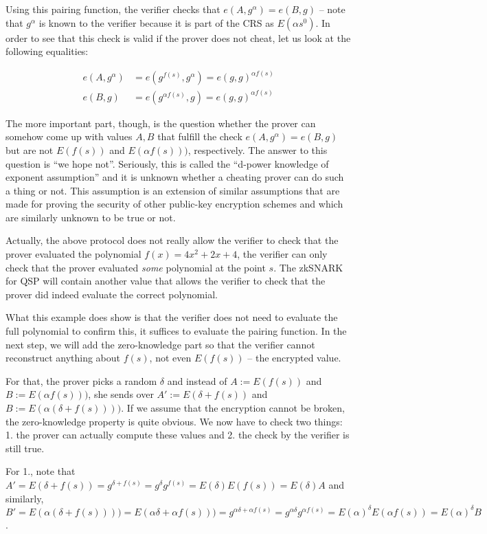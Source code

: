 \documentclass[11pt,letterpaper]{article}
\begin{document}
Using this pairing function, the verifier checks that $e(A, g^{\alpha }) = e(B, g)$ -- note that $g^{\alpha }$ is known to the verifier because it is part of the CRS as $E(\alpha s^{0})$. In order to see that this check is valid if the prover does not cheat, let us look at the following equalities:

\begin{align*}
e(A, g^{\alpha }) &= e(g^{f(s)}, g^{\alpha }) = e(g, g)^{\alpha  f(s)} \\
e(B, g) &= e(g^{\alpha  f(s)}, g) = e(g, g)^{\alpha  f(s)}
\end{align*}

The more important part, though, is the question whether the prover can somehow come up with values $A, B$ that fulfill the check $e(A, g^{\alpha }) = e(B, g)$ but are not $E(f(s))$ and $E(\alpha  f(s)))$, respectively. The answer to this question is ``we hope not''. Seriously, this is called the ``d-power knowledge of exponent assumption'' and it is unknown whether a cheating prover can do such a thing or not. This assumption is an extension of similar assumptions that are made for proving the security of other public-key encryption schemes and which are similarly unknown to be true or not.


Actually, the above protocol does not really allow the verifier to check that the prover evaluated the polynomial $f(x) = 4x^{2} + 2x + 4$, the verifier can only check that the prover evaluated \textit{some} polynomial at the point $s$. The zkSNARK for QSP will contain another value that allows the verifier to check that the prover did indeed evaluate the correct polynomial.


What this example does show is that the verifier does not need to evaluate the full polynomial to confirm this, it suffices to evaluate the pairing function. In the next step, we will add the zero-knowledge part so that the verifier cannot reconstruct anything about $f(s)$, not even $E(f(s))$ -- the encrypted value.


For that, the prover picks a random $\delta$  and instead of $A := E(f(s))$ and $B := E(\alpha  f(s)))$, she sends over $A' := E(\delta  + f(s))$ and $B := E(\alpha  (\delta  + f(s))))$. If we assume that the encryption cannot be broken, the zero-knowledge property is quite obvious. We now have to check two things: 1. the prover can actually compute these values and 2. the check by the verifier is still true.


For 1., note that $A' = E(\delta  + f(s)) = g^{\delta  + f(s)} = g^{\delta }g^{f(s)} = E(\delta ) E(f(s)) = E(\delta ) A$ and similarly, $B' = E(\alpha  (\delta  + f(s)))) = E(\alpha  \delta  + \alpha  f(s))) = g^{\alpha  \delta  + \alpha  f(s)} = g^{\alpha  \delta } g^{\alpha  f(s)} = E(\alpha )^{\delta }E(\alpha  f(s)) = E(\alpha )^{\delta } B$.
\end{document}

